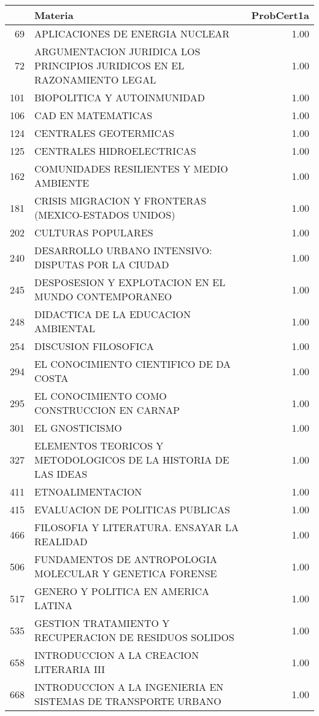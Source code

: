 \documentclass[12pt]{article}
\begin{document}
\begin{table}[ht]
\centering
\begin{tabular}{rlr}
  \hline
 & Materia & ProbCert1a \\ 
  \hline
69 & APLICACIONES DE ENERGIA NUCLEAR & 1.00 \\ 
  72 & ARGUMENTACION JURIDICA LOS PRINCIPIOS JURIDICOS EN EL RAZONAMIENTO LEGAL & 1.00 \\ 
  101 & BIOPOLITICA Y AUTOINMUNIDAD & 1.00 \\ 
  106 & CAD EN MATEMATICAS & 1.00 \\ 
  124 & CENTRALES GEOTERMICAS & 1.00 \\ 
  125 & CENTRALES HIDROELECTRICAS & 1.00 \\ 
  162 & COMUNIDADES RESILIENTES Y MEDIO AMBIENTE & 1.00 \\ 
  181 & CRISIS MIGRACION Y FRONTERAS (MEXICO-ESTADOS UNIDOS) & 1.00 \\ 
  202 & CULTURAS POPULARES & 1.00 \\ 
  240 & DESARROLLO URBANO INTENSIVO: DISPUTAS POR LA CIUDAD & 1.00 \\ 
  245 & DESPOSESION Y EXPLOTACION EN EL MUNDO CONTEMPORANEO & 1.00 \\ 
  248 & DIDACTICA DE LA EDUCACION AMBIENTAL & 1.00 \\ 
  254 & DISCUSION FILOSOFICA & 1.00 \\ 
  294 & EL CONOCIMIENTO CIENTIFICO DE DA COSTA & 1.00 \\ 
  295 & EL CONOCIMIENTO COMO CONSTRUCCION EN CARNAP & 1.00 \\ 
  301 & EL GNOSTICISMO & 1.00 \\ 
  327 & ELEMENTOS TEORICOS Y METODOLOGICOS DE LA HISTORIA DE LAS IDEAS & 1.00 \\ 
  411 & ETNOALIMENTACION & 1.00 \\ 
  415 & EVALUACION DE POLITICAS PUBLICAS & 1.00 \\ 
  466 & FILOSOFIA Y LITERATURA. ENSAYAR LA REALIDAD & 1.00 \\ 
  506 & FUNDAMENTOS DE ANTROPOLOGIA MOLECULAR Y GENETICA FORENSE & 1.00 \\ 
  517 & GENERO Y POLITICA EN AMERICA LATINA & 1.00 \\ 
  535 & GESTION TRATAMIENTO Y RECUPERACION DE RESIDUOS SOLIDOS & 1.00 \\ 
  658 & INTRODUCCION A LA CREACION LITERARIA III & 1.00 \\ 
  668 & INTRODUCCION A LA INGENIERIA EN SISTEMAS DE TRANSPORTE URBANO & 1.00 \\ 

\end{tabular}
\end{table}
\end{document}

